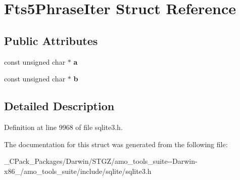 \hypertarget{struct_fts5_phrase_iter}{}\section{Fts5\+Phrase\+Iter Struct Reference}
\label{struct_fts5_phrase_iter}
\subsection*{Public Attributes}
\begin{DoxyCompactItemize}
\item 
\mbox{\label{struct_fts5_phrase_iter_ae7989e86f7246b1edf3f090867ae0604}} 
const unsigned char $\ast$ {\bfseries a}
\item 
\mbox{\label{struct_fts5_phrase_iter_ac783edf6256522bd2a48a35bee957327}} 
const unsigned char $\ast$ {\bfseries b}
\end{DoxyCompactItemize}


\subsection{Detailed Description}


Definition at line 9968 of file sqlite3.\+h.



The documentation for this struct was generated from the following file\+:\begin{DoxyCompactItemize}
\item 
\+\_\+\+C\+Pack\+\_\+\+Packages/\+Darwin/\+S\+T\+G\+Z/amo\+\_\+tools\+\_\+suite-\/-\/\+Darwin-\/x86\+\_/amo\+\_\+tools\+\_\+suite/include/sqlite/sqlite3.\+h\end{DoxyCompactItemize}
